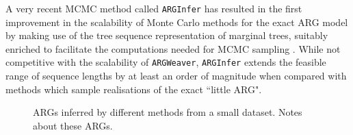 \documentclass{article}
\begin{document}
A very recent MCMC method called \texttt{ARGInfer} has resulted in the first
improvement in the scalability of Monte Carlo methods for the exact ARG model
by making use of the tree sequence representation of marginal trees, suitably enriched
to facilitate the computations needed for MCMC sampling \citep{mahmoudi2021inference}.
While not competitive with the scalability of \texttt{ARGWeaver}, \texttt{ARGInfer} extends
the feasible range of sequence lengths by at least an order of magnitude when
compared with methods which sample realisations of the exact ``little ARG".


\begin{figure}
\vspace{5em}
\caption{\label{fig-inferred-args}
ARGs inferred by different methods from a small dataset. Notes about these
ARGs.
}
\end{figure}



\end{document}
